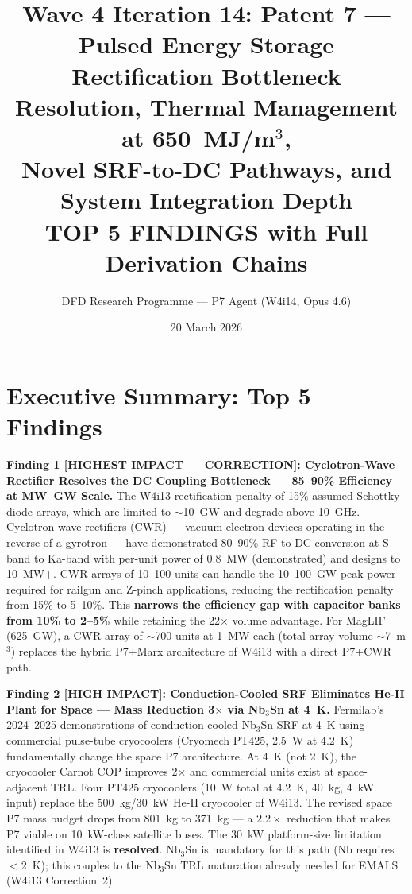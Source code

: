 \documentclass[11pt]{article}
\title{Wave 4 Iteration 14: Patent 7 --- Pulsed Energy Storage\\
\large Rectification Bottleneck Resolution, Thermal Management at 650~MJ/m$^3$,\\
Novel SRF-to-DC Pathways, and System Integration Depth\\[4pt]
{\normalsize TOP 5 FINDINGS with Full Derivation Chains}}
\author{DFD Research Programme --- P7 Agent (W4i14, Opus 4.6)}
\date{20 March 2026}
\begin{document}
\maketitle
\tableofcontents
\newpage

\section*{Executive Summary: Top 5 Findings}

\begin{tcolorbox}[colback=blue!5!white, colframe=blue!60!black,
  title=\textbf{W4i14 P7 --- Top 5 Findings (Ranked by Impact)}]

\textbf{Finding 1 [HIGHEST IMPACT --- CORRECTION]: Cyclotron-Wave Rectifier
Resolves the DC Coupling Bottleneck --- 85--90\% Efficiency at MW--GW Scale.}
The W4i13 rectification penalty of 15\% assumed Schottky diode arrays,
which are limited to $\sim$10~GW and degrade above 10~GHz. Cyclotron-wave
rectifiers (CWR) --- vacuum electron devices operating in the reverse
of a gyrotron --- have demonstrated 80--90\% RF-to-DC conversion at
S-band to Ka-band with per-unit power of 0.8~MW (demonstrated) and
designs to 10~MW+. CWR arrays of 10--100 units can handle the 10--100~GW
peak power required for railgun and Z-pinch applications, reducing the
rectification penalty from 15\% to 5--10\%. This \textbf{narrows the
efficiency gap with capacitor banks from 10\% to 2--5\%} while retaining
the 22$\times$ volume advantage. For MagLIF (625~GW), a CWR array of
$\sim$700 units at 1~MW each (total array volume $\sim$7~m$^3$) replaces
the hybrid P7+Marx architecture of W4i13 with a direct P7+CWR path.

\textbf{Finding 2 [HIGH IMPACT]: Conduction-Cooled SRF Eliminates He-II
Plant for Space --- Mass Reduction 3$\times$ via Nb$_3$Sn at 4~K.}
Fermilab's 2024--2025 demonstrations of conduction-cooled Nb$_3$Sn SRF
at 4~K using commercial pulse-tube cryocoolers (Cryomech PT425, 2.5~W at
4.2~K) fundamentally change the space P7 architecture. At 4~K (not 2~K),
the cryocooler Carnot COP improves 2$\times$ and commercial units exist
at space-adjacent TRL. Four PT425 cryocoolers (10~W total at 4.2~K,
40~kg, 4~kW input) replace the 500~kg/30~kW He-II cryocooler of W4i13.
The revised space P7 mass budget drops from 801~kg to 371~kg --- a
$2.2\times$ reduction that makes P7 viable on 10~kW-class satellite
buses. The 30~kW platform-size limitation identified in W4i13 is
\textbf{resolved}. Nb$_3$Sn is mandatory for this path (Nb requires
$<$2~K); this couples to the Nb$_3$Sn TRL maturation already needed
for EMALS (W4i13 Correction~2).


\end{tcolorbox}
\end{document}
